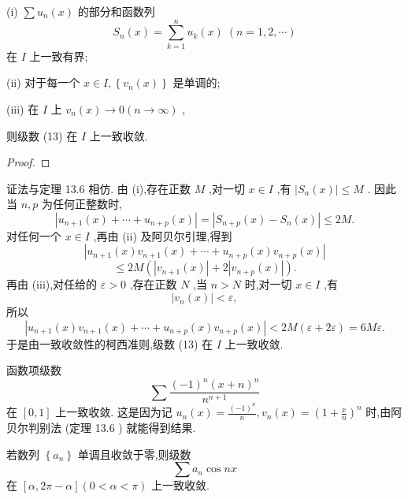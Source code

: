 (i) \(\sum {u}_{n}\left( x\right)\) 的部分和函数列
\[
{S}_{n}\left( x\right)  = \mathop{\sum }\limits_{{k = 1}}^{n}{u}_{k}\left( x\right) \;\left( {n = 1,2,\cdots }\right)
\]
在 \(I\) 上一致有界;

(ii) 对于每一个 \(x \in  I,\left\{  {{v}_{n}\left( x\right) }\right\}\) 是单调的;

(iii) 在 \(I\) 上 \({v}_{n}\left( x\right)  \rightarrow  0\left( {n \rightarrow  \infty }\right)\) ,

则级数 (13) 在 \(I\) 上一致收敛.

\begin{proof}

\end{proof}
证法与定理 13.6 相仿. 由 (i),存在正数 \(M\) ,对一切 \(x \in  I\) ,有 \(\left| {{S}_{n}\left( x\right) }\right|  \leq  M\) . 因此当 \(n,p\) 为任何正整数时,
\[
\left| {{u}_{n + 1}\left( x\right)  + \cdots  + {u}_{n + p}\left( x\right) }\right|  = \left| {{S}_{n + p}\left( x\right)  - {S}_{n}\left( x\right) }\right|  \leq  {2M}.
\]
对任何一个 \(x \in  I\) ,再由 (ii) 及阿贝尔引理,得到
\[
\left| {{u}_{n + 1}\left( x\right) {v}_{n + 1}\left( x\right)  + \cdots  + {u}_{n + p}\left( x\right) {v}_{n + p}\left( x\right) }\right|
\]
\[
\leq  {2M}\left( {\left| {{v}_{n + 1}\left( x\right) }\right|  + 2\left| {{v}_{n + p}\left( x\right) }\right| }\right) .
\]
再由 (iii),对任给的 \(\varepsilon  > 0\) ,存在正数 \(N\) ,当 \(n > N\) 时,对一切 \(x \in  I\) ,有
\[
\left| {{v}_{n}\left( x\right) }\right|  < \varepsilon ,
\]
所以
\[
\left| {{u}_{n + 1}\left( x\right) {v}_{n + 1}\left( x\right)  + \cdots  + {u}_{n + p}\left( x\right) {v}_{n + p}\left( x\right) }\right|  < {2M}\left( {\varepsilon  + {2\varepsilon }}\right)  = {6M\varepsilon }.
\]
于是由一致收敛性的柯西准则,级数 (13) 在 \(I\) 上一致收敛.

\begin{example}

\end{example}
函数项级数
\[
\sum \frac{{\left( -1\right) }^{n}{\left( x + n\right) }^{n}}{{n}^{n + 1}}
\]
在 \(\left\lbrack  {0,1}\right\rbrack\) 上一致收敛. 这是因为记 \({u}_{n}\left( x\right)  = \frac{{\left( -1\right) }^{n}}{n},{v}_{n}\left( x\right)  = {\left( 1 + \frac{x}{n}\right) }^{n}\) 时,由阿贝尔判别法 (定理 13.6 ) 就能得到结果.

\begin{example}

\end{example}
若数列 \(\left\{  {a}_{n}\right\}\) 单调且收敛于零,则级数
\[
\sum {a}_{n}\cos {nx} \tag{14}
\]
在 \(\left\lbrack  {\alpha ,{2\pi } - \alpha }\right\rbrack  \left( {0 < \alpha  < \pi }\right)\) 上一致收敛.

